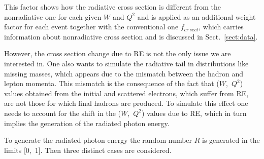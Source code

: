 This factor shows how the radiative cross section is different from the nonradiative one for each given $W$ and $Q^2$ and is applied as an additional weight factor for each event together with the conventional one $f_{cr~sect}$, which carries information about nonradiative cross section and is discussed in Sect.~\ref{sect:data}.

However, the cross section change due to RE is not the only issue we are interested in. One also wants to simulate the radiative tail in distributions like missing masses, which appears due to the mismatch between the hadron and lepton momenta. This mismatch is the consequence of the fact that ($W$,~$Q^2$) values obtained from the initial and scattered electrons, which suffer from RE, are not those for which final hadrons are produced. To simulate this effect one needs to account for the shift in the ($W$,~$Q^2$) values due to RE, which in turn implies the generation of the radiated photon energy.

To generate the radiated photon energy the random number $R$ is generated in the limits [0,~1]. Then three distinct cases are considered.

